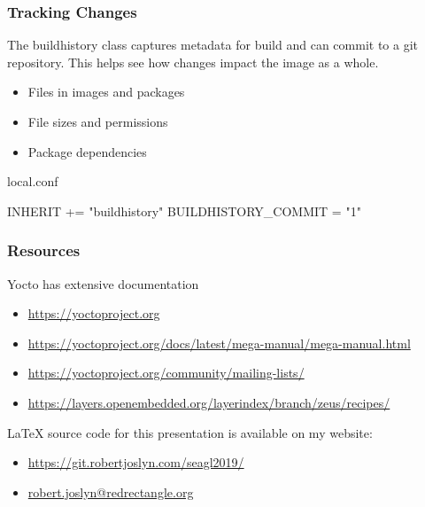 \documentclass[aspectratio=169]{beamer}
\begin{document}
\begin{frame}[fragile]
\frametitle{Tracking Changes}
The buildhistory class captures metadata for build and can commit to a git
repository. This helps see how changes impact the image as a whole.
\begin{itemize}
	\item Files in images and packages
	\item File sizes and permissions
	\item Package dependencies
\end{itemize}
\begin{block}{local.conf}
\begin{semiverbatim}
INHERIT += "buildhistory"
BUILDHISTORY\_COMMIT = "1"
\end{semiverbatim}
\end{block}
\end{frame}

\begin{frame}
\frametitle{Resources}
Yocto has extensive documentation
\begin{itemize}
	\item \url{https://yoctoproject.org}
	\item \url{https://yoctoproject.org/docs/latest/mega-manual/mega-manual.html}
	\item \url{https://yoctoproject.org/community/mailing-lists/}
	\item \url{https://layers.openembedded.org/layerindex/branch/zeus/recipes/}
\end{itemize}
\LaTeX{} source code for this presentation is available on my website:
\begin{itemize}
	\item \url{https://git.robertjoslyn.com/seagl2019/}
	\item \url{robert.joslyn@redrectangle.org}
\end{itemize}
\end{frame}
\end{document}
